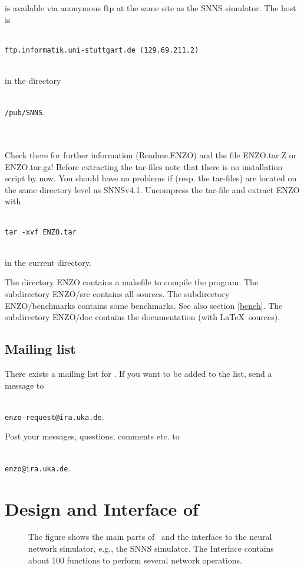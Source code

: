 \ENZO is available via anonymous ftp at the same site as the
SNNS simulator. The host is\\
\\
\centerline {\verb+ftp.informatik.uni-stuttgart.de (129.69.211.2)+}
\\
in the directory\\
\\
\centerline {\verb+/pub/SNNS+.}\\
\\
Check there for further information (Readme.ENZO)
and the  file ENZO.tar.Z or ENZO.tar.gz!
Before extracting the tar-files note that there is no installation script
by now. You should have no problems if
\ENZO (resp. the tar-files) are  located on the same directory level
as SNNSv4.1.
Uncompress the tar-file and extract ENZO with\\
\\
\centerline {\verb+tar -xvf ENZO.tar+}
\\
in the current directory.

The directory ENZO contains a makefile to compile the program.
The subdirectory ENZO/src contains all sources.
The subdirectory ENZO/benchmarks contains some benchmarks.
See also section \ref{bench}.
The subdirectory ENZO/doc contains the documentation (with \LaTeX\  sources). 

\subsection{Mailing list}

There exists a mailing list for \ENZO. If you want to be added to the list,
send a message to\\
\\
\centerline{\verb+enzo-request@ira.uka.de+.}

\vspace*{0.5cm}

Post your messages, questions, comments etc. to\\
\\
\centerline{\verb+enzo@ira.uka.de+.}




\section{Design and Interface of \ENZO}

\begin{figure}[htb]

\caption[Design and Interfaces of \ENZO\ ]{\label{design}
{\small The figure shows the main parts of
\ENZO\ and the interface
to the neural network simulator, e.g., the SNNS simulator. The Interface
contains about 100 functions to perform several network operations.}}
\end{figure}

